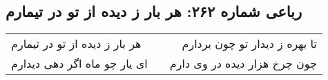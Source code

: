 \begin{center}
\section*{رباعی شماره ۲۶۲: هر بار ز دیده از تو در تیمارم}
\label{sec:sh262}
\begin{longtable}{l p{0.5cm} r}
هر بار ز دیده از تو در تیمارم
&&
تا بهره ز دیدار تو چون بردارم
\\
ای یار چو ماه اگر دهی دیدارم
&&
چون چرخ هزار دیده در وی دارم
\\
\end{longtable}
\end{center}
